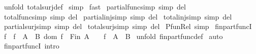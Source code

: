 \begin{isabellebody}
%
\isadelimproof
%
\endisadelimproof
%
\isatagproof
{}\isamarkupfalse%
\ {\isacharparenleft}unfold\ total{\isacharunderscore}surj{\isacharunderscore}def{\isacharparenright}\isanewline
{}\isamarkupfalse%
\ simp\isanewline
{}\isamarkupfalse%
\ fast\isanewline
{}\isamarkupfalse%
%
\endisatagproof
{\isafoldproof}%
%
\isadelimproof
\isanewline
%
\endisadelimproof
\isanewline
\isanewline
\isanewline
{}\isamarkupfalse%
\ partial{\isacharunderscore}func{\isacharunderscore}simp\ {\isacharbrackleft}simp\ del{\isacharbrackright}\isanewline
{}\isamarkupfalse%
\ total{\isacharunderscore}func{\isacharunderscore}simp\ {\isacharbrackleft}simp\ del{\isacharbrackright}\isanewline
{}\isamarkupfalse%
\ partial{\isacharunderscore}inj{\isacharunderscore}simp\ {\isacharbrackleft}simp\ del{\isacharbrackright}\isanewline
{}\isamarkupfalse%
\ total{\isacharunderscore}inj{\isacharunderscore}simp\ {\isacharbrackleft}simp\ del{\isacharbrackright}\isanewline
{}\isamarkupfalse%
\ partial{\isacharunderscore}surj{\isacharunderscore}simp\ {\isacharbrackleft}simp\ del{\isacharbrackright}\isanewline
{}\isamarkupfalse%
\ total{\isacharunderscore}surj{\isacharunderscore}simp\ {\isacharbrackleft}simp\ del{\isacharbrackright}\isanewline
{}\isamarkupfalse%
\ Pfun{\isacharunderscore}Rel\ {\isacharbrackleft}simp{\isacharbrackright}\isanewline
\isanewline
\isanewline
{}\isamarkupfalse%
\ fin{\isacharunderscore}part{\isacharunderscore}funcI{\isacharcolon}\ \isanewline
{\isachardoublequoteopen}{\isacharbang}{\isacharbang}\ f{\isachardot}\ {\isacharbrackleft}{\isacharbar}\ f\ {\isacharcolon}\ A\ {\isacharminus}{\isacharbar}{\isacharminus}{\isachargreater}\ B{\isacharsemicolon}\ dom\ f\ {\isacharcolon}\ Fin\ A\ {\isacharbar}{\isacharbrackright}\ {\isacharequal}{\isacharequal}{\isachargreater}\ \ f\ {\isacharcolon}\ A\ {\isacharminus}{\isacharbar}{\isacharbar}{\isacharminus}{\isachargreater}\ B{\isachardoublequoteclose}\isanewline
%
\isadelimproof
%
\endisadelimproof
%
\isatagproof
{}\isamarkupfalse%
\ {\isacharparenleft}unfold\ fin{\isacharunderscore}part{\isacharunderscore}func{\isacharunderscore}def{\isacharparenright}\isanewline
{}\isamarkupfalse%
\ auto\isanewline
{}\isamarkupfalse%
%
\endisatagproof
{\isafoldproof}%
%
\isadelimproof
\isanewline
%
\endisadelimproof
{}\isamarkupfalse%
\ fin{\isacharunderscore}part{\isacharunderscore}funcI\ {\isacharbrackleft}intro{\isacharbang}{\isacharbrackright}\isanewline

\end{isabellebody}
